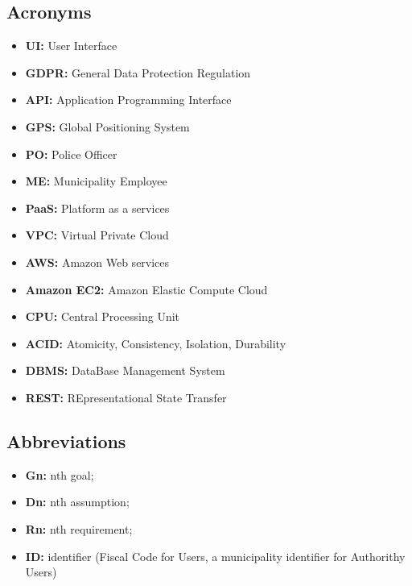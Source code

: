         \subsection{Acronyms}
        \begin{itemize}
            \item \textbf{UI:} User Interface 
            \item \textbf{GDPR:} General Data Protection Regulation 
            \item \textbf{API:} Application Programming Interface
            \item \textbf{GPS:} Global Positioning System 
            \item \textbf{PO:} Police Officer 
            \item \textbf{ME:} Municipality Employee
            \item \textbf{PaaS:} Platform as a services
            \item \textbf{VPC:} Virtual Private Cloud
            \item \textbf{AWS:} Amazon\textsuperscript{\textcopyright} Web services
            \item \textbf{Amazon\textsuperscript{\textcopyright} EC2:} Amazon\textsuperscript{\textcopyright} Elastic Compute Cloud
            \item \textbf{CPU:} Central Processing Unit
            \item \textbf{ACID:} Atomicity, Consistency, Isolation, Durability
            \item \textbf{DBMS:} DataBase Management System
            \item \textbf{REST:} REpresentational State Transfer
        \end{itemize}
    
        \subsection{Abbreviations}
        \begin{itemize}            
            \item \textbf{Gn:} nth goal; 
            \item \textbf{Dn:} nth assumption;
            \item \textbf{Rn:} nth requirement; 
            \item \textbf{ID: } identifier (Fiscal Code for Users, a
            municipality identifier for Authorithy Users)
        \end{itemize}
        
